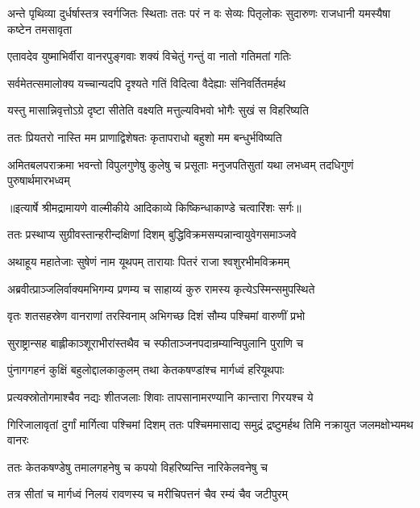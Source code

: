 \threelineshloka
{अन्ते पृथिव्या दुर्धर्षास्तत्र स्वर्गजितः स्थिताः}
{ततः परं न वः सेव्यः पितृलोकः सुदारुणः}
{राजधानी यमस्यैषा कष्टेन तमसावृता} %

\twolineshloka
{एतावदेव युष्माभिर्वीरा वानरपुङ्गवाः}
{शक्यं विचेतुं गन्तुं वा नातो गतिमतां गतिः} %

\twolineshloka
{सर्वमेतत्समालोक्य यच्चान्यदपि दृश्यते}
{गतिं विदित्वा वैदेह्याः संनिवर्तितमर्हथ} %

\twolineshloka
{यस्तु मासान्निवृत्तोऽग्रे दृष्टा सीतेति वक्ष्यति}
{मत्तुल्यविभवो भोगैः सुखं स विहरिष्यति} %

\twolineshloka
{ततः प्रियतरो नास्ति मम प्राणाद्विशेषतः}
{कृतापराधो बहुशो मम बन्धुर्भविष्यति} %

\fourlineindentedshloka
{अमितबलपराक्रमा भवन्तो}
{विपुलगुणेषु कुलेषु च प्रसूताः}
{मनुजपतिसुतां यथा लभध्वम्}
{तदधिगुणं पुरुषार्थमारभध्वम्} %


{॥इत्यार्षे श्रीमद्रामायणे वाल्मीकीये आदिकाव्ये किष्किन्धाकाण्डे चत्वारिंशः सर्गः॥}


\twolineshloka
{ततः प्रस्थाप्य सुग्रीवस्तान्हरीन्दक्षिणां दिशम्}
{बुद्धिविक्रमसम्पन्नान्वायुवेगसमाञ्जवे} %

\twolineshloka
{अथाहूय महातेजाः सुषेणं नाम यूथपम्}
{तारायाः पितरं राजा श्वशुरभीमविक्रमम्} %

\twolineshloka
{अब्रवीत्प्राञ्जलिर्वाक्यमभिगम्य प्रणम्य च}
{साहाय्यं कुरु रामस्य कृत्येऽस्मिन्समुपस्थिते} %

\twolineshloka
{वृतः शतसहस्रेण वानराणां तरस्विनाम्}
{अभिगच्छ दिशं सौम्य पश्चिमां वारुणीं प्रभो} %

\twolineshloka
{सुराष्ट्रान्सह बाह्लीकाञ्शूराभीरांस्तथैव च}
{स्फीताञ्जनपदान्रम्यान्विपुलानि पुराणि च} %

\twolineshloka
{पुंनागगहनं कुक्षिं बहुलोद्दालकाकुलम्}
{तथा केतकषण्डांश्च मार्गध्वं हरियूथपाः} %

\twolineshloka
{प्रत्यक्स्रोतोगमाश्चैव नद्यः शीतजलाः शिवाः}
{तापसानामरण्यानि कान्तारा गिरयश्च ये} %

\threelineshloka
{गिरिजालावृतां दुर्गां मार्गित्वा पश्चिमां दिशम्}
{ततः पश्चिममासाद्य समुद्रं द्रष्टुमर्हथ}
{तिमि नक्रायुत जलमक्षोभ्यमथ वानरः} %

\twolineshloka
{ततः केतकषण्डेषु तमालगहनेषु च}
{कपयो विहरिष्यन्ति नारिकेलवनेषु च} %

\twolineshloka
{तत्र सीतां च मार्गध्वं निलयं रावणस्य च}
{मरीचिपत्तनं चैव रम्यं चैव जटीपुरम्} %

